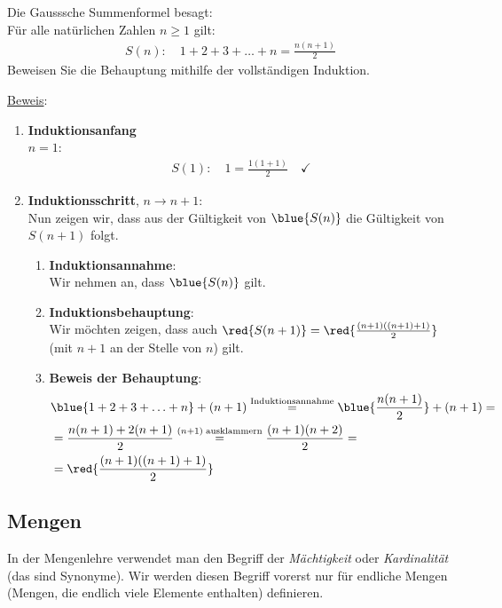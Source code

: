 \begin{myexercise}%
	\noindent
	Die Gausssche Summenformel besagt:\\
	Für alle natürlichen Zahlen $n\geq 1$ gilt:
	\begin{align*}
		S(n):\quad 1+2+3+\ldots +n = \frac{n(n+1)}{2}
	\end{align*}
	Beweisen Sie die Behauptung mithilfe der vollständigen Induktion.
\end{myexercise}
\begin{myanswer}
	\noindent
	\underline{Beweis}:
	\begin{enumerate}
		\item \textbf{Induktionsanfang}\\
		      $n = 1$:
		      \begin{align*}
			      S(1):\quad 1 = \frac{1(1+1)}{2} \quad \checkmark
		      \end{align*}
		\item \textbf{Induktionsschritt}, $n\to n+1$:\\
		      Nun zeigen wir, dass aus der Gültigkeit von $\blue{S(n)}$ die Gültigkeit von $S(n+1)$ folgt.
		      \begin{enumerate}
			      \item \textbf{Induktionsannahme}:\\
			            Wir nehmen an, dass $\blue{S(n)}$ gilt.
			      \item \textbf{Induktionsbehauptung}:\\
			            Wir möchten zeigen, dass auch $\red{S(n+1)} = \red{\frac{(n+1)((n+1)+1)}{2}}$ (mit $n+1$ an der Stelle von $n$) gilt.
			      \item \textbf{Beweis der Behauptung}:
			            \begin{align*}
				             & \blue{1+2+3+\ldots +n}+(n+1) \stackrel{\text{Induktionsannahme}}{=} \blue{\frac{n(n+1)}{2}} + (n+1) = \\
				             & = \frac{n(n+1)+2(n+1)}{2} \stackrel{(n+1)\; \text{ausklammern}}{=} \frac{(n+1)(n+2)}{2} =             \\
				             & = \red{\frac{(n+1)((n+1)+1)}{2}}
			            \end{align*}
		      \end{enumerate}
	\end{enumerate}
\end{myanswer}


\clearpage
\subsection{Mengen}
In der Mengenlehre verwendet man den Begriff der \textit{Mächtigkeit} oder \textit{Kardinalität} (das sind Synonyme). Wir werden diesen Begriff vorerst nur für endliche Mengen (Mengen, die endlich viele Elemente enthalten) definieren.

